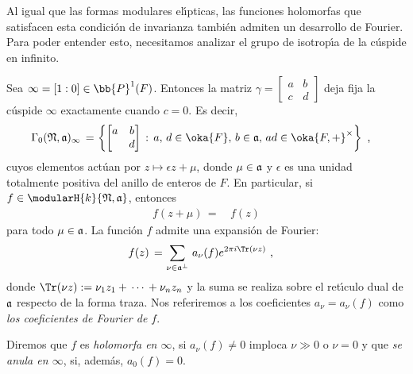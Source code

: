 
Al igual que las formas modulares el\'{\i}pticas, las funciones
holomorfas que satisfacen esta condici\'{o}n de invarianza tambi\'{e}n
admiten un desarrollo de Fourier. Para poder entender esto, necesitamos
analizar el grupo de isotrop\'{\i}a de la c\'{u}spide en infinito.

Sea $\infty=[1:0]\in\bb{P}^{1}(F)$. Entonces la matriz
$\gamma=\begin{bmatrix} a & b \\ c & d \end{bmatrix}$ deja fija la
c\'{u}spide $\infty$ exactamente cuando $c=0$. Es decir,
\begin{align*}
	\Gamma_{0}(\frak{N},\frak{a})_{\infty} \,=\, &
	\left\lbrace
	\begin{bmatrix} a & b \\ & d \end{bmatrix}\,:\,
		a,\,d\in\oka{F},\,b\in\frak{a},\,ad\in\oka{F,+}^{\times}
		\right\rbrace\text{ ,}
\end{align*}
%
cuyos elementos act\'{u}an por $z\mapsto\epsilon z+\mu$, donde
$\mu\in\frak{a}$ y $\epsilon$ es una unidad totalmente positiva del
anillo de enteros de $F$. En particular, si
$f\in\modularH{k}{\frak{N},\frak{a}}$, entonces
\begin{align*}
	f(z+\mu) \,=\, & f(z)
\end{align*}
%
para todo $\mu\in\frak{a}$. La funci\'{o}n $f$ admite una expansi\'{o}n
de Fourier:
\begin{align*}
	f(z) \,=\, & \sum_{\nu\in\frak{a}^{\perp}}\,
	a_{\nu}(f)e^{2\pi i\Tr(\nu z)}
	\text{ ,}
\end{align*}
%
donde
\begin{math}
	\Tr(\nu z):=\nu_{1}z_{1}+\,\cdots\,+\nu_{n}z_{n}
\end{math}
y la suma se realiza sobre el ret\'{\i}culo dual de $\frak{a}$ respecto de
la forma traza. Nos referiremos a los coeficientes $a_{\nu}= a_{\nu}(f)$
como \emph{los coeficientes de Fourier de $f$}.

Diremos que $f$ es \emph{holomorfa en $\infty$}, si $a_{\nu}(f)\not =0$
imploca $\nu\gg 0$ o $\nu=0$ y que \emph{se anula en $\infty$}, si,
adem\'{a}s, $a_{0}(f)=0$.

